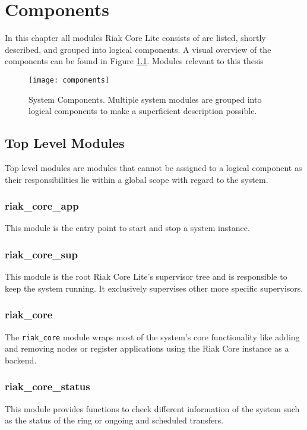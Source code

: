 \chapter{Components}
\label{chap:components}
In this chapter all modules Riak Core Lite consists of are listed, shortly described, and grouped into logical components.
A visual overview of the components can be found in Figure \ref{fig:components}.
Modules relevant to this thesis 
\begin{figure}
\texttt{[image: components]}
\caption[System Components]{System Components. Multiple system modules are grouped into logical components to make a superficient description possible.}
\label{fig:components}
\end{figure}

\section{Top Level Modules}
	Top level modules are modules that cannot be assigned to a logical component as their responsibilities lie within a global scope with regard to the system.
	\subsection{riak\_core\_app}
		This module is the entry point to start and stop a system instance.
	
	\subsection{riak\_core\_sup}
		This module is the root Riak Core Lite's supervisor tree and is responsible to keep the system running.
		It exclusively supervises other more specific supervisors.
	
	\subsection{riak\_core}
		The \lstinline!riak_core! module wraps most of the system's core functionality like adding and removing nodes or register applications using the Riak Core instance as a backend.
	
	\subsection{riak\_core\_status}
		This module provides functions to check different information of the system such as the status of the ring or ongoing and scheduled transfers.


